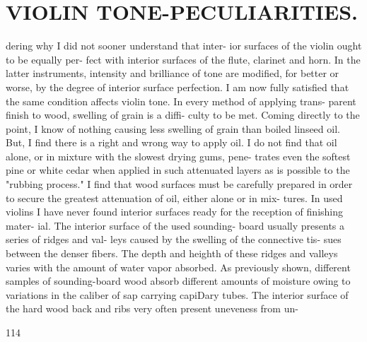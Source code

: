 \documentclass{article}
\begin{document}
\section*{VIOLIN TONE-PECULIARITIES.}
dering why I did not sooner understand that inter- ior surfaces of the violin ought to be equally per- fect with interior surfaces of the flute, clarinet and horn. In the latter instruments, intensity and brilliance of tone are modified, for better or worse, by the degree of interior surface perfection. I am now fully satisfied that the same condition affects violin tone. In every method of applying trans- parent finish to wood, swelling of grain is a diffi- culty to be met. Coming directly to the point, I know of nothing causing less swelling of grain than boiled linseed oil. But, I find there is a right and wrong way to apply oil. I do not find that oil alone, or in mixture with the slowest drying gums, pene- trates even the softest pine or white cedar when applied in such attenuated layers as is possible to the "rubbing process." I find that wood surfaces must be carefully prepared in order to secure the greatest attenuation of oil, either alone or in mix- tures. In used violins I have never found interior surfaces ready for the reception of finishing mater- ial. The interior surface of the used sounding- board usually presents a series of ridges and val- leys caused by the swelling of the connective tis- sues between the denser fibers. The depth and heighth of these ridges and valleys varies with the amount of water vapor absorbed. As previously shown, different samples of sounding-board wood absorb different amounts of moisture owing to variations in the caliber of sap carrying capiDary tubes. The interior surface of the hard wood back and ribs very often present uneveness from un-

114
\end{document}
